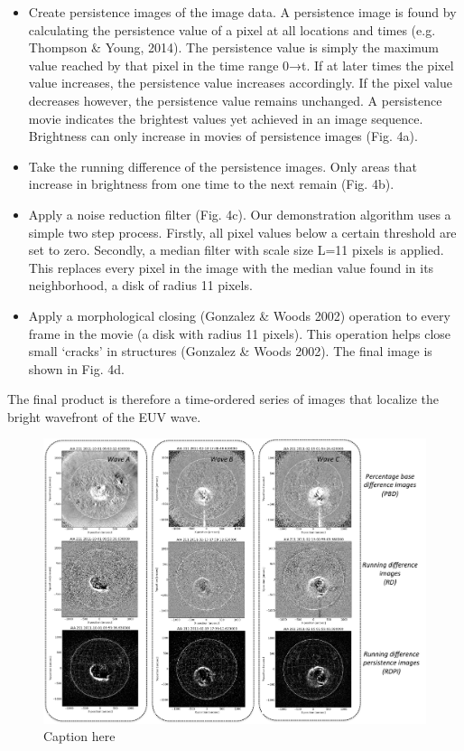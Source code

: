 \begin{itemize}
\item Create persistence images of the image data.  A persistence image is found by calculating the persistence value of a pixel at all locations and times (e.g. Thompson & Young, 2014).  The persistence value is simply the maximum value reached by that pixel in the time range 0→t.  If at later times the pixel value increases, the persistence value increases accordingly. If the pixel value decreases however, the persistence value remains unchanged. A persistence movie indicates the brightest values yet achieved in an image sequence.  Brightness can only increase in movies of persistence images (Fig. 4a). 


\item Take the running difference of the persistence images. Only areas that increase in brightness from one time to the next remain (Fig. 4b).

\item Apply a noise reduction filter (Fig. 4c).  Our demonstration algorithm uses a simple two step process.  Firstly, all pixel values below a certain threshold are set to zero.  Secondly, a median filter with scale size L=11 pixels is applied.  This replaces every pixel in the image with the median value found in its neighborhood, a disk of radius 11 pixels.

\item Apply a morphological closing (Gonzalez & Woods 2002) operation to every frame in the movie (a disk with radius 11 pixels).  This operation helps close small ‘cracks’ in structures (Gonzalez & Woods 2002).  The final image is shown in Fig. 4d.
\end{itemize}

The final product is therefore a time-ordered series of images that localize the bright wavefront of the EUV wave.

\begin{figure}
\begin{center}
\includegraphics[width=16cm]{aware_rdpm_figure_v3.pdf}
\caption{Caption here}
\end{center}
\end{figure}



